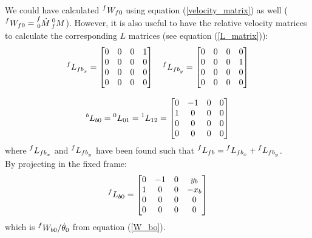 \documentclass[a4paper,12pt,oneside]{report}
\begin{document}
\\
We could have calculated $\prescript{f}{}{W_{f0}}$ using equation (\ref{velocity_matrix}) as well ($\prescript{f}{}{W_{f0}}=\prescript{f}{0}{\dot{M}}\prescript{0}{f}{M}$). However, it is also useful to have the relative velocity matrices to calculate the corresponding $L$ matrices (see equation (\ref{L_matrix})):
\begin{equation}
  \begin{array}{c}
    \prescript{f}{}{L_{{fb}_x}}=\begin{bmatrix}
      0&0&0&1\\
      0&0&0&0\\
      0&0&0&0\\
      0&0&0&0
    \end{bmatrix} \quad
    \prescript{f}{}{L_{{fb}_y}}=\begin{bmatrix}
      0&0&0&0\\
      0&0&0&1\\
      0&0&0&0\\
      0&0&0&0
    \end{bmatrix}\\ \\
    \prescript{b}{}{L_{b0}}=\prescript{0}{}{L_{01}}=\prescript{1}{}{L_{12}}=\begin{bmatrix}
      0&-1&0&0\\
      1&0&0&0\\
      0&0&0&0\\
      0&0&0&0
    \end{bmatrix}
  \end{array}
  \label{L_matrices}
\end{equation}
where $\prescript{f}{}{L_{{fb}_x}}$ and $\prescript{f}{}{L_{{fb}_y}}$ have been found such that $\prescript{f}{}{L_{fb}}=\prescript{f}{}{L_{{fb}_x}}+\prescript{f}{}{L_{{fb}_y}}$.\\
By projecting in the fixed frame:
\begin{equation}
  \prescript{f}{}{L_{b0}}=\begin{bmatrix}
    0&-1&0&y_b\\
    1&0&0&-x_b\\
    0&0&0&0\\
    0&0&0&0
  \end{bmatrix}
\end{equation}
which is $\prescript{f}{}{W_{b0}}/ \dot{\theta}_0$ from equation (\ref{W_bo}).
\newpage
\end{document}
